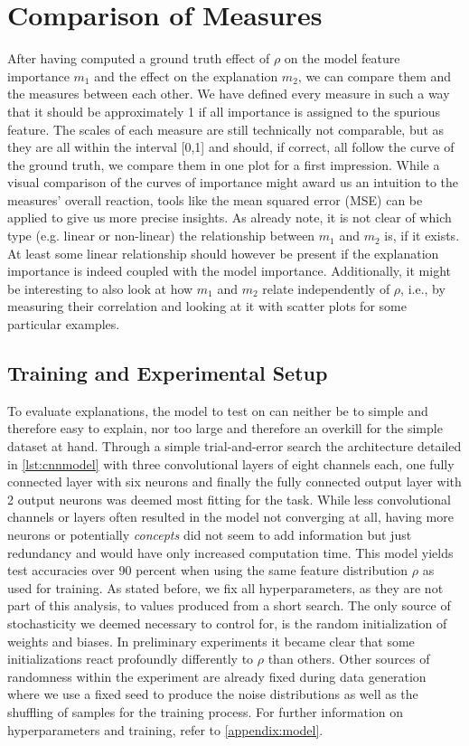 \section{Comparison of Measures}\label{section:experiment_setup}
After having computed a ground truth effect of $\rho$ on the model feature importance $m_1$ and the effect on the explanation $m_2$, we can compare them and the measures between each other.
We have defined every measure in such a way that it should be approximately 1 if all importance is assigned to the spurious feature. The scales of each measure are still technically not comparable, but as they are all within the interval [0,1] and should, if correct, all follow the curve of the ground truth, we compare them in one plot for a first impression.
While a visual comparison of the curves of importance might award us an intuition to the measures' overall reaction, tools like the mean squared error (MSE) can be applied to give us more precise insights. As \citet{Karimi2023} already note,
it is not clear of which type (e.g. linear or non-linear) the relationship between $m_1$ and $m_2$ is, if it exists. At least some linear relationship should however be present if the explanation importance is indeed coupled with the model importance.
Additionally, it might be interesting to also look at how $m_1$ and $m_2$ relate independently of $\rho$, i.e., by measuring their correlation and looking at it with scatter plots for some particular examples. 


\subsection{Training and Experimental Setup}\label{section:model_zoo}
To evaluate explanations, the model to test on can neither be to simple and therefore easy to explain, nor too large and therefore an overkill for the simple dataset at hand.
Through a simple trial-and-error search the architecture detailed in \cref{lst:cnnmodel} with three convolutional layers of eight channels each, one fully connected layer with six neurons and finally the fully connected output layer with 2 output neurons was deemed most fitting for the task. While less convolutional channels or layers often resulted in the model not converging at all, having more neurons or potentially \textit{concepts} did not seem to add information but just redundancy and would have only increased computation time.
This model yields test accuracies over 90 percent when using the same feature distribution $\rho$ as used for training. As stated before, we fix all hyperparameters, as they are not part of this analysis, to values produced from a short search.
The only source of stochasticity we deemed necessary to control for, is the random initialization of weights and biases. In preliminary experiments it became clear that some initializations react profoundly differently to $\rho$ than others. Other sources of randomness within the experiment are already fixed during data generation where we use a fixed seed to produce the noise distributions as well as the shuffling of samples for the training process. 
For further information on hyperparameters and training, refer to \cref{appendix:model}.
